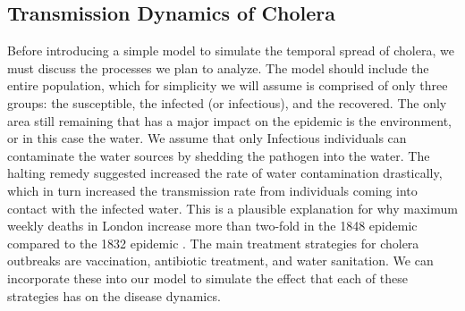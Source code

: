 \documentclass[12pt]{article}\usepackage[]{graphicx}\usepackage[]{color}
\begin{document}
\subsection{Transmission Dynamics of Cholera}
Before introducing a simple model to simulate the temporal spread of cholera, we must discuss the processes we plan to analyze.
The model should include the entire population, which for simplicity we will assume is comprised of only three groups: the susceptible, the infected (or infectious), and the recovered.
The only area still remaining that has a major impact on the epidemic is the environment, or in this case the water.
We assume that only Infectious individuals can contaminate the water sources by shedding the pathogen into the water.
The halting remedy suggested increased the rate of water contamination drastically, which in turn increased the transmission rate from individuals coming into contact with the infected water.
This is a plausible explanation for why maximum weekly deaths in London increase more than two-fold in the 1848 epidemic compared to the 1832 epidemic \citep{link3}.
The main treatment strategies for cholera outbreaks are vaccination, antibiotic treatment, and water sanitation.
We can incorporate these into our model to simulate the effect that each of these strategies has on the disease dynamics.
\end{document}
